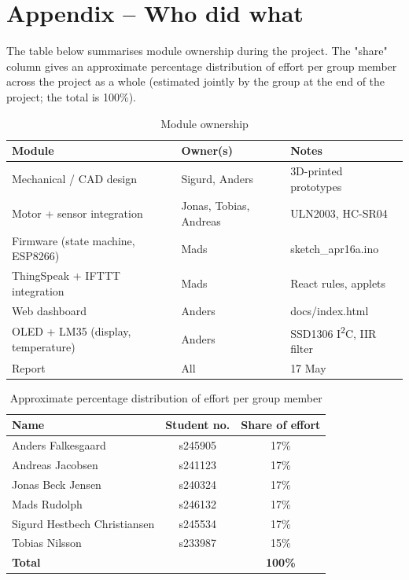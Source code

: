 \documentclass{article}
\begin{document}
\fi

\section{Appendix -- Who did what}
\label{sec:appendix-who}

The table below summarises module ownership during the project. The "share" column gives an approximate percentage distribution of effort per group member across the project as a whole (estimated jointly by the group at the end of the project; the total is 100\%).

\begin{table}[H]
    \centering
    \begin{tabular}{l|l|l}
        \textbf{Module} & \textbf{Owner(s)} & \textbf{Notes} \\
        \hline
        Mechanical / CAD design                  & Sigurd, Anders              & 3D-printed prototypes \\
        Motor + sensor integration               & Jonas, Tobias, Andreas      & ULN2003, HC-SR04 \\
        Firmware (state machine, ESP8266)        & Mads                        & sketch\_apr16a.ino \\
        ThingSpeak + IFTTT integration           & Mads                        & React rules, applets \\
        Web dashboard                            & Anders                      & docs/index.html \\
        OLED + LM35 (display, temperature)       & Anders                      & SSD1306 I\textsuperscript{2}C, IIR filter \\
        Report                                   & All                         & 17 May \\
    \end{tabular}
    \caption{Module ownership}
    \label{tab:modulansvar}
\end{table}

\begin{table}[H]
    \centering
    \begin{tabular}{l|c|c}
        \textbf{Name} & \textbf{Student no.} & \textbf{Share of effort} \\
        \hline
        Anders Falkesgaard            & s245905 & 17\% \\
        Andreas Jacobsen              & s241123 & 17\% \\
        Jonas Beck Jensen             & s240324 & 17\% \\
        Mads Rudolph                  & s246132 & 17\% \\
        Sigurd Hestbech Christiansen  & s245534 & 17\% \\
        Tobias Nilsson                & s233987 & 15\% \\
        \hline
        \textbf{Total}                &         & \textbf{100\%}\\
    \end{tabular}
    \caption{Approximate percentage distribution of effort per group member}
    \label{tab:tidsforbrug}
\end{table}
\end{document}
